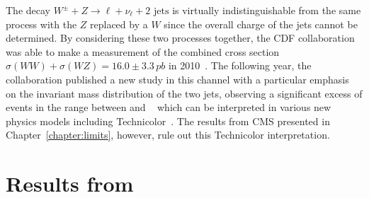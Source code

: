 The decay $W^\pm + Z \to \ell + \nu_\ell + \text{2 jets}$ is virtually indistinguishable from the same process with the $Z$ replaced by a $W$ since the overall charge of the jets cannot be determined.  By considering these two processes together, the CDF collaboration was able to make a measurement of the combined cross section $\sigma(WW) + \sigma(WZ) = 16.0 \pm 3.3\, \si{pb}$ in 2010~\cite{Aaltonen:2009vh}.  The following year, the collaboration published a new study in this channel with a particular emphasis on the invariant mass distribution of the two jets, observing a significant excess of events in the range between  and ~\cite{Aaltonen:2011mk} which can be interpreted in various new physics models including Technicolor~\cite{Eichten:2012br}.  The results from CMS presented in Chapter~\ref{chapter:limits}, however, rule out this Technicolor interpretation.


\section{Results from \dzero}

